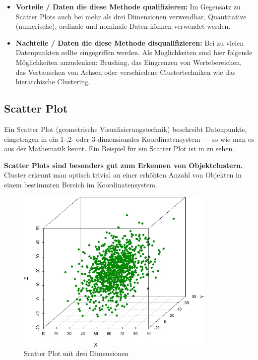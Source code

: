 \documentclass[a4paper,12pt,ngerman]{scrartcl}
\begin{document}
\begin{itemize}
	\item \textbf{Vorteile / Daten die diese Methode qualifizieren:}
	Im Gegensatz zu Scatter Plots auch bei mehr als drei Dimensionen verwendbar. Quantitative (numerische), ordinale und nominale Daten können verwendet werden.

	\item \textbf{Nachteile / Daten die diese Methode disqualifizieren:}
	Bei zu vielen Datenpunkten sollte eingegriffen werden. Als Möglichkeiten sind hier folgende Möglichkeiten anzudenken: Brushing, das Eingrenzen von Wertebereichen, das Vertauschen von Achsen oder verschiedene Clustertechniken wie das hierarchische Clustering.
\end{itemize}

\subsection*{Scatter Plot}
Ein Scatter Plot (geometrische Visualisierungstechnik) beschreibt Datenpunkte, eingetragen in ein 1-,2- oder 3-dimensionales Koordinatensystem --- so wie man es aus der Mathematik kennt. Ein Beispiel für ein Scatter Plot ist in  zu sehen.

\textbf{Scatter Plots sind besonders gut zum Erkennen von Objektclustern.} Cluster erkennt man optisch trivial an einer erhöhten Anzahl von Objekten in einem bestimmten Bereich im Koordinatensystem.

\begin{figure}[ht]
    \centering
    \includegraphics[height=8cm]{includes/scatter-plot}
    \caption{Scatter Plot mit drei Dimensionen}
    \label{fig:scatter-plot}
\end{figure}
\end{document}
